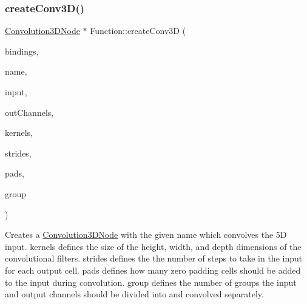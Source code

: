 \subsubsection{\texorpdfstring{create\+Conv3\+D()}{createConv3D()}\hspace{0.1cm}{\footnotesize\ttfamily [3/4]}}
{\footnotesize\ttfamily \hyperlink{classglow_1_1_convolution3_d_node}{Convolution3\+D\+Node} $\ast$ Function\+::create\+Conv3D (\begin{DoxyParamCaption}\item[{\hyperlink{classglow_1_1_placeholder_bindings}{Placeholder\+Bindings} \&}]{bindings,  }\item[{llvm\+::\+String\+Ref}]{name,  }\item[{\hyperlink{structglow_1_1_node_value}{Node\+Value}}]{input,  }\item[{size\+\_\+t}]{out\+Channels,  }\item[{llvm\+::\+Array\+Ref$<$ \hyperlink{namespaceglow_a0ca574644e1e42ef193a9947fb4d8911}{unsigned\+\_\+t} $>$}]{kernels,  }\item[{llvm\+::\+Array\+Ref$<$ \hyperlink{namespaceglow_a0ca574644e1e42ef193a9947fb4d8911}{unsigned\+\_\+t} $>$}]{strides,  }\item[{llvm\+::\+Array\+Ref$<$ \hyperlink{namespaceglow_a0ca574644e1e42ef193a9947fb4d8911}{unsigned\+\_\+t} $>$}]{pads,  }\item[{\hyperlink{namespaceglow_a0ca574644e1e42ef193a9947fb4d8911}{unsigned\+\_\+t}}]{group }\end{DoxyParamCaption})}

Creates a \hyperlink{classglow_1_1_convolution3_d_node}{Convolution3\+D\+Node} with the given {\ttfamily name} which convolves the 5D {\ttfamily input}. {\ttfamily kernels} defines the size of the height, width, and depth dimensions of the convolutional filters. {\ttfamily strides} defines the the number of steps to take in the input for each output cell. {\ttfamily pads} defines how many zero padding cells should be added to the input during convolution. {\ttfamily group} defines the number of groups the input and output channels should be divided into and convolved separately. \mbox{\label{classglow_1_1_function_a99742506dcf9c372bb92cf74e8160de2}} 
